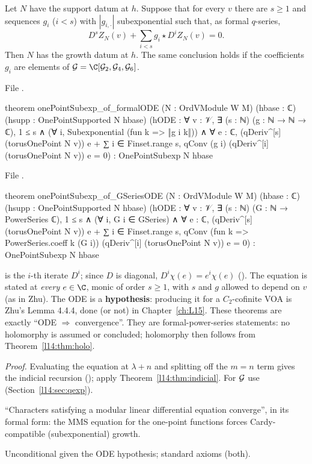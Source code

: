 \begin{theorem}\label{l14:thm:formalODE}
Let $N$ have the support datum at $h$. Suppose that for every $v$ there are $s\ge1$ and sequences $g_i$ ($i<s$) with
$|g_{i,\cdot}|$ subexponential such that, as formal $q$-series,
\begin{equation*}
  D^sZ_N(v) + \sum_{i<s}g_i\star D^iZ_N(v) = 0 .
\end{equation*}
Then $N$ has the growth datum at $h$. The same conclusion holds if the coefficients $g_i$ are elements of $\lfourteenGS =
\C[\mathcal G_2,\mathcal G_4,\mathcal G_6]$.
\end{theorem}
\noindent File .
\begin{leancode}
theorem onePointSubexp_of_formalODE (N : OrdVModule W M) (hbase : ℂ)
    (hsupp : OnePointSupported N hbase)
    (hODE : ∀ v : 𝒱, ∃ (s : ℕ) (g : ℕ → ℕ → ℂ), 1 ≤ s ∧
      (∀ i, Subexponential (fun k => ‖g i k‖)) ∧
      ∀ e : ℂ, (qDeriv^[s] (torusOnePoint N v)) e
        + ∑ i ∈ Finset.range s, qConv (g i) (qDeriv^[i] (torusOnePoint N v)) e = 0) :
    OnePointSubexp N hbase
\end{leancode}
\noindent File .
\begin{leancode}
theorem onePointSubexp_of_GSeriesODE (N : OrdVModule W M) (hbase : ℂ)
    (hsupp : OnePointSupported N hbase)
    (hODE : ∀ v : 𝒱, ∃ (s : ℕ) (G : ℕ → PowerSeries ℂ), 1 ≤ s ∧
      (∀ i, G i ∈ GSeries) ∧
      ∀ e : ℂ, (qDeriv^[s] (torusOnePoint N v)) e
        + ∑ i ∈ Finset.range s,
            qConv (fun k => PowerSeries.coeff k (G i)) (qDeriv^[i] (torusOnePoint N v)) e = 0) :
    OnePointSubexp N hbase
\end{leancode}
\begin{dictionary}
 is the $i$-th iterate $D^i$; since $D$ is diagonal, $D^i\chi(e) = e^i\chi(e)$ ().
The equation is stated at \emph{every} $e\in\C$, monic of order $s\ge1$, with $s$ and $g$ allowed to depend on $v$ (as in
Zhu). The ODE is a \textbf{hypothesis}: producing it for a $C_2$-cofinite VOA is Zhu's Lemma 4.4.4, done (or not) in
Chapter~\ref{ch:L15}. These theorems are exactly ``ODE $\Rightarrow$ convergence''. They are formal-power-series statements:
no holomorphy is assumed or concluded; holomorphy then follows from Theorem~\ref{l14:thm:holo}.
\end{dictionary}
\noindent\emph{Proof.} Evaluating the equation at $\lambda+n$ and splitting off the $m=n$ term gives the indicial recursion
(); apply Theorem~\ref{l14:thm:indicial}. For $\mathcal{G}$ use
 (Section~\ref{l14:sec:qexp}).
\begin{physics}
``Characters satisfying a modular linear differential equation converge'', in its formal form: the MMS equation for the
one-point functions forces Cardy-compatible (subexponential) growth.
\end{physics}
\begin{status}
Unconditional given the ODE hypothesis; standard axioms (both).
\end{status}

